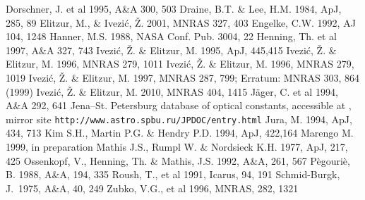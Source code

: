 \documentclass[11pt]{article}
\def\Ivezic {Ivezi\'c}
\begin{document}
\newpage

\begin{thebibliography}{99}
 Dorschner, J. et al 1995, A\&A 300, 503
 Draine, B.T. \& Lee, H.M. 1984, ApJ, 285, 89
 Elitzur, M., \& \Ivezic, \v Z. 2001, MNRAS 327, 403
 Engelke, C.W. 1992, AJ 104, 1248
 Hanner, M.S. 1988, NASA Conf. Pub. 3004, 22
 Henning, Th. et al 1997, A\&A 327, 743
 \Ivezic, \v Z. \& Elitzur, M. 1995, ApJ, 445,415
 \Ivezic, \v Z. \& Elitzur, M. 1996, MNRAS 279, 1011
 \Ivezic, \v Z. \& Elitzur, M. 1996, MNRAS 279, 1019
 \Ivezic, \v Z. \& Elitzur, M. 1997, MNRAS 287, 799;
  Erratum: MNRAS 303, 864 (1999)
 \Ivezic, \v Z. \& Elitzur, M. 2010, MNRAS 404, 1415
 J\"ager, C. et al 1994, A\&A 292, 641
 Jena--St. Petersburg database of optical constants,
  accessible at , \newline
  mirror site {\tt http://www.astro.spbu.ru/JPDOC/entry.html}
 Jura, M. 1994, ApJ, 434, 713
 Kim S.H., Martin P.G. \& Hendry P.D. 1994, ApJ,
  422,164
 Marengo M. 1999, in preparation
 Mathis J.S., Rumpl W. \& Nordsieck K.H. 1977, ApJ,
  217, 425
 Ossenkopf, V., Henning, Th. \& Mathis, J.S. 1992,
  A\&A, 261, 567
 P\`egouri\`e, B. 1988, A\&A, 194, 335
 Roush, T., et al 1991, Icarus, 94, 191
 Schmid-Burgk, J.\ 1975, A\&A, 40, 249
 Zubko, V.G., et al 1996, MNRAS, 282, 1321

\end{thebibliography}
\end{document}
